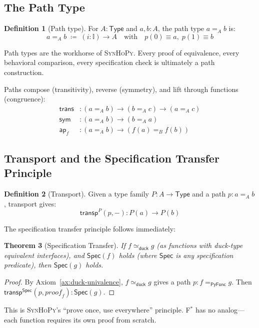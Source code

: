 \documentclass[11pt,a4paper]{report}
\theoremstyle{definition}
\newtheorem{definition}{Definition}[chapter]
\theoremstyle{plain}
\newtheorem{theorem}[definition]{Theorem}
\newcommand{\Type}{\mathsf{Type}}
\newcommand{\PyFunc}{\mathsf{PyFunc}}
\newcommand{\interval}{\mathbb{I}}
\newcommand{\transp}{\mathsf{transp}}
\newcommand{\sym}{\mathsf{sym}}
\newcommand{\ap}{\mathsf{ap}}
\newcommand{\defeq}{\coloneqq}
\newcommand{\Spec}{\mathsf{Spec}}
\newcommand{\fstar}{F$^{*}$}
\newcommand{\synhopy}{\textsc{SynHoPy}}
\begin{document}
\subsection{The Path Type}

\begin{definition}[Path type]
For $A : \Type$ and $a, b : A$, the path type $a =_A b$ is:
\[
  a =_A b \;\defeq\; (i : \interval) \to A \quad\text{with}\quad p(0) \equiv a,\; p(1) \equiv b
\]
\end{definition}

Path types are the workhorse of \synhopy{}. Every proof of equivalence, every
behavioral comparison, every specification check is ultimately a path
construction.

Paths compose (transitivity), reverse (symmetry), and lift through functions
(congruence):
\begin{align}
  \mathsf{trans} &: (a =_A b) \to (b =_A c) \to (a =_A c) \\
  \sym &: (a =_A b) \to (b =_A a) \\
  \ap_f &: (a =_A b) \to (f(a) =_B f(b))
\end{align}


\subsection{Transport and the Specification Transfer Principle}

\begin{definition}[Transport]
Given a type family $P : A \to \Type$ and a path $p : a =_A b$, transport gives:
\[
  \transp^P(p, -) : P(a) \to P(b)
\]
\end{definition}

The specification transfer principle follows immediately:

\begin{theorem}[Specification Transfer]
\label{thm:spec-transfer}
If $f \simeq_{\mathsf{duck}} g$ (as functions with duck-type equivalent interfaces),
and $\Spec(f)$ holds (where $\Spec$ is any specification predicate), then
$\Spec(g)$ holds.
\end{theorem}
\begin{proof}
By Axiom~\ref{ax:duck-univalence}, $f \simeq_{\mathsf{duck}} g$ gives a path
$p : f =_{\PyFunc} g$. Then $\transp^{\Spec}(p, \mathit{proof}_f) : \Spec(g)$.
\end{proof}

This is \synhopy{}'s ``prove once, use everywhere'' principle. \fstar{} has no
analog---each function requires its own proof from scratch.
\end{document}
